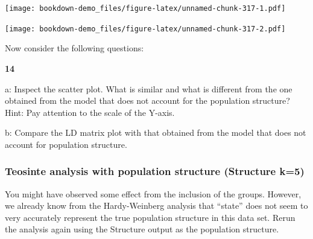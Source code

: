 \documentclass[
]{book}
\makeatletter
\newenvironment{Shaded}{\begin{snugshade}}{\end{snugshade}}
\newcommand{\AttributeTok}[1]{\textcolor[rgb]{0.77,0.63,0.00}{#1}}
\newcommand{\DecValTok}[1]{\textcolor[rgb]{0.00,0.00,0.81}{#1}}
\newcommand{\FloatTok}[1]{\textcolor[rgb]{0.00,0.00,0.81}{#1}}
\newcommand{\FunctionTok}[1]{\textcolor[rgb]{0.00,0.00,0.00}{#1}}
\newcommand{\NormalTok}[1]{#1}
\newcommand{\OtherTok}[1]{\textcolor[rgb]{0.56,0.35,0.01}{#1}}
\newcommand{\SpecialCharTok}[1]{\textcolor[rgb]{0.00,0.00,0.00}{#1}}
\newcommand{\StringTok}[1]{\textcolor[rgb]{0.31,0.60,0.02}{#1}}
\newenvironment{kframe}{%
\medskip{}
\setlength{\fboxsep}{.8em}
 \def\at@end@of@kframe{}%
 \ifinner\ifhmode%
  \def\at@end@of@kframe{\end{minipage}}%
  \begin{minipage}{\columnwidth}%
 \fi\fi%
 \def\FrameCommand##1{\hskip\@totalleftmargin \hskip-\fboxsep
 \colorbox{shadecolor}{##1}\hskip-\fboxsep
     \hskip-\linewidth \hskip-\@totalleftmargin \hskip\columnwidth}%
 \MakeFramed {\advance\hsize-\width
   \@totalleftmargin\z@ \linewidth\hsize
   \@setminipage}}%
 {\par\unskip\endMakeFramed%
 \at@end@of@kframe}
\newenvironment{rmdblock}[1]
  {
  \begin{itemize}
  \renewcommand{\labelitemi}{
    \raisebox{-.7\height}[0pt][0pt]{
      {\setkeys{Gin}{width=3em,keepaspectratio}\texttt{[image: images/\#1]}}
    }
  }
  \setlength{\fboxsep}{1em}
  \begin{kframe}
  \item
  }
  {
  \end{kframe}
  \end{itemize}
  }
\newenvironment{rmdquiz}
  {\begin{rmdblock}{quiz}}
  {\end{rmdblock}}
\makeatother
\begin{document}
\texttt{[image: bookdown-demo\_files/figure-latex/unnamed-chunk-317-1.pdf]}

\begin{Shaded}
\end{Shaded}

\texttt{[image: bookdown-demo\_files/figure-latex/unnamed-chunk-317-2.pdf]}

Now consider the following questions:

\begin{rmdquiz}
\textbf{14}

a: Inspect the scatter plot. What is similar and what is different from the one obtained from the model that does not account for the population structure? Hint: Pay attention to the scale of the Y-axis.

b: Compare the LD matrix plot with that obtained from the model that does not account for population structure.
\end{rmdquiz}

\hypertarget{teosinte-analysis-with-population-structure-structure-k5}{%
\subsubsection{Teosinte analysis with population structure (Structure k=5)}\label{teosinte-analysis-with-population-structure-structure-k5}}

You might have observed some effect from the inclusion of the groups. However, we already know from the Hardy-Weinberg analysis that ``state'' does not seem to very accurately represent the true population structure in this data set. Rerun the analysis again using the Structure output as the population structure.
\end{document}

